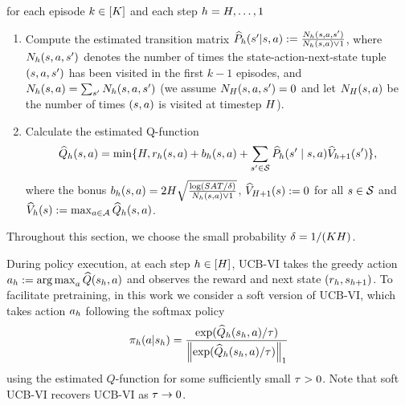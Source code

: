 for each episode $k\in[{K}]$ and each step $h={H},\ldots,1$
\begin{enumerate}
    \item Compute the estimated transition matrix $\widehat{P}_h({s}'|{s},{a}):=   \frac{{N}_h({s},{a},{s}')}{{N}_h({s},{a})\vee 1}$,  where ${N}_h({s},{a},{s}')$ denotes the number of times the state-action-next-state tuple $({s},{a},{s}')$ has been visited in the first $k-1$ episodes, and ${N}_h({s},{a})=\sum_{{s}'}{N}_h({s},{a},{s}')$ (we assume ${N}_{H}({s},{a},{s}')=0$ and let ${N}_{H}({s},{a})$  be the number of times $({s},{a})$ is visited at timestep ${H}$).
    \item Calculate the estimated Q-function \begin{align*}
{\widehat{{Q}}}_h({s},{a})=\min\{{H},{r}_h({s},{a})+{b}_h({s},{a})+\sum_{{s}'\in{\mathcal{S}}}\widehat{P}_h({s}'\mid{s},{a}){\widehat{{{V}}}}_{h+1}({s}')\},\end{align*}
where the bonus ${b}_h({s},{a})=2{H}\sqrt{\frac{\log({S}{A}{T}/\delta)}{{N}_h({s},{a})\vee1}}$,  ${\widehat{{{V}}}}_{{H}+1}({s}):=0$ for all ${s}\in{\mathcal{S}}$ and ${\widehat{{{V}}}}_h({s}):=\max_{{a}\in{\mathcal{A}}}{\widehat{{Q}}}_h({s},{a})$. 
\end{enumerate} Throughout this section, we choose the small probability $\delta=1/({K}{H})$. 


During policy execution, at each step $h\in[{H}]$, UCB-VI takes the greedy action ${a}_h:=\operatorname*{arg\,max}_{{a}}{\widehat{{Q}}}({s}_h,{a})$ and observes the reward and next state $({r}_h,{s}_{h+1})$. To facilitate pretraining, in this work we consider a soft version of UCB-VI, which takes action ${a}_h$  following the softmax policy 
\begin{align*}
{\pi}_h({a}|{s}_h)=\frac{\exp({\widehat{{Q}}}_h({s}_h,{a})/{\tau})}{\left\|{\exp({\widehat{{Q}}}_h({s}_h,{a})/{\tau})}\right\|_1}
\end{align*}
using the estimated $Q$-function for some sufficiently small ${\tau}>0$. Note that soft UCB-VI recovers UCB-VI as ${\tau}\to 0$.



